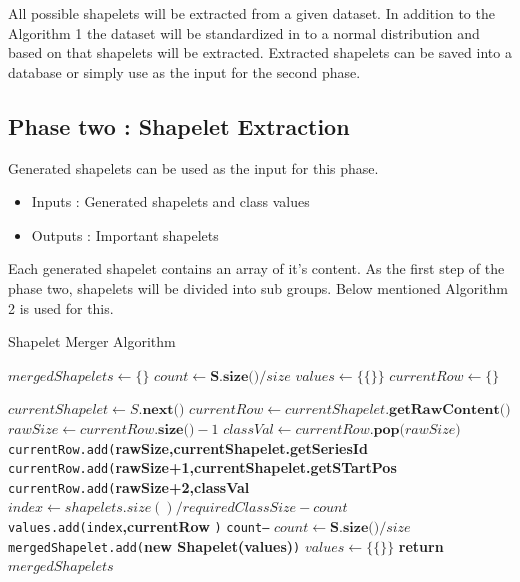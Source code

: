 \documentclass[letterpaper, 10 pt, conference]{IEEEtran}  %
\begin{document}
All possible shapelets will be extracted from a given dataset. In addition to the Algorithm 1 the dataset will be standardized in to a normal distribution and based on that shapelets will be extracted. Extracted shapelets can be saved into a database or simply use as the input for the second phase. 

\subsection{Phase two : Shapelet Extraction}
Generated shapelets can be used as the input for this phase.
\begin{itemize}
\item Inputs : Generated shapelets and class values
\item Outputs : Important shapelets
\end{itemize}
Each generated shapelet contains an array of it’s content. As the first step of the phase two, shapelets will be divided into sub groups. Below mentioned Algorithm 2 is used for this.
 


\begin{algorithm}
\caption{Shapelet Merger Algorithm}\label{shapeletMerger}
\begin{algorithmic}[1]
\State $mergedShapelets \gets \{\}$
\State $count \gets \textbf{S.size()}/size$
\State $values \gets \{\{\}\}$    
\State $currentRow \gets \{\}$
      
     \State $currentShapelet \gets S.\textbf{next()}$
     \State $currentRow \gets currentShapelet.\textbf{getRawContent()}$
     \State $rawSize \gets currentRow.\textbf{size()}-1$
     \State $classVal \gets currentRow.\textbf{pop(}rawSize\textbf{})$
     \State \texttt{currentRow.add(}\textbf{rawSize,currentShapelet.getSeriesId}
     \State \texttt{currentRow.add(}\textbf{rawSize+1,currentShapelet.getSTartPos}
     \State \texttt{currentRow.add(}\textbf{rawSize+2,classVal}
     \State $index \gets shapelets.size()/requiredClassSize - count$
     \State \texttt{values.add(index}\textbf{,currentRow} \texttt{)}
     \State \texttt{count--}   
     \Else
     	\State $count \gets \textbf{S.size()}/size$
     	\State \texttt{mergedShapelet.add(}\textbf{new Shapelet(values)}\texttt{)}
     	\State $values \gets \{\{\}\}$ 
     \EndIf
\EndWhile
\State \textbf{return} $mergedShapelets$
\EndProcedure
\end{algorithmic}
\end{algorithm}
\end{document}
